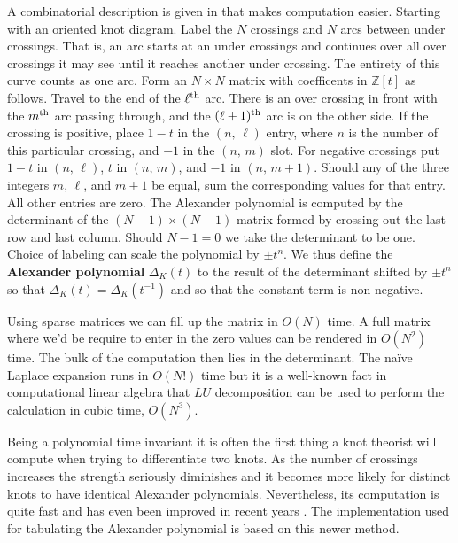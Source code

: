     A combinatorial description is given in
    \cite[p.~49]{LivingstonKnotTheory} that makes computation easier. Starting
    with an oriented knot diagram. Label the $N$ crossings and $N$ arcs
    between under crossings. That is, an arc starts at an under crossings and
    continues over all over crossings it may see until it reaches another
    under crossing. The entirety of this curve counts as one arc.
    Form an $N\times{N}$ matrix with coefficents in $\mathbb{Z}[t]$
    as follows. Travel to the end of the $\ell^{\small\textrm{th}}$ arc.
    There is an over crossing in front with the $m^{\small\textrm{th}}$
    arc passing through, and the $(\ell+1)^{\small\textrm{th}}$ arc is on the
    other side. If the crossing is positive, place $1-t$ in the
    $(n,\,\ell)$ entry, where $n$ is the number of this particular crossing,
    and $-1$ in the $(n,\,m)$ slot. For negative crossings put
    $1-t$ in $(n,\,\ell)$, $t$ in $(n,\,m)$, and
    $-1$ in $(n,\,m+1)$. Should any of the three integers $m$, $\ell$, and $m+1$
    be equal, sum the corresponding values for that entry. All other entries
    are zero. The Alexander polynomial is computed by the
    determinant of the $(N-1)\times(N-1)$ matrix formed by crossing out the
    last row and last column. Should $N-1=0$ we take the determinant to be
    one. Choice of labeling can scale the polynomial by $\pm{t}^{n}$. We thus
    define the \textbf{Alexander polynomial} $\Delta_{K}(t)$ to the result of
    the determinant shifted by $\pm{t}^{n}$ so that
    $\Delta_{K}(t)=\Delta_{K}(t^{-1})$ and so that the constant term is
    non-negative.
    \par\hfill\par
    Using sparse matrices we can fill up the matrix in $O(N)$ time. A full
    matrix where we'd be require to enter in the zero values can be rendered
    in $O(N^{2})$ time. The bulk of the computation then lies in the
    determinant. The na\"{i}ve Laplace expansion runs in $O(N!)$ time but it
    is a well-known fact in computational linear algebra that $LU$
    decomposition can be used to perform the calculation in cubic time,
    $O(N^{3})$.
    \par\hfill\par
    Being a polynomial time invariant
    it is often the first thing a knot theorist will
    compute when trying to differentiate two knots. As the number of crossings
    increases the strength seriously diminishes and it becomes more likely
    for distinct knots to have identical Alexander polynomials. Nevertheless,
    its computation is quite fast and has even been improved in recent years
    \cite{BarNatanPolynomialTimeKnotPolynomials}. The implementation used
    for tabulating the Alexander polynomial is based on this newer method.
